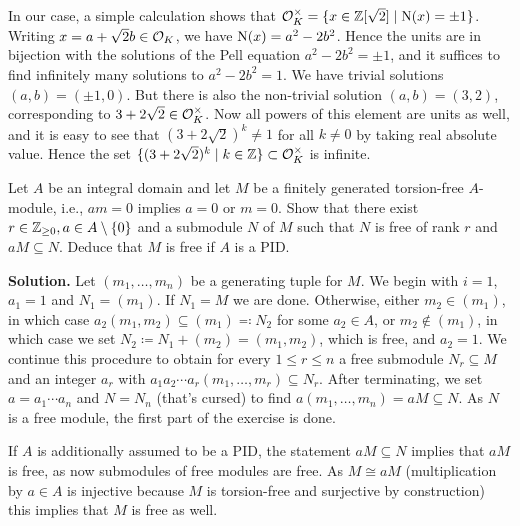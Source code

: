 \documentclass[a4paper,11pt]{article}
\begin{document}
In our case, a simple calculation shows that $\mathcal{O}_K^\times = \{x \in 
\mathbb{Z}[\sqrt 2] \mid \operatorname{N}(x) = \pm 1\}$. Writing $x = a + \sqrt 2 b \in \mathcal{O}_K$, we have
$\operatorname{N}(x) = a^2 - 2b^2$. Hence the units are in bijection with the solutions of
the Pell equation $a^2 - 2b^2 = \pm 1$, and it suffices to find infinitely many 
solutions to $a^2 - 2b^2 = 1$. We have trivial solutions $(a,b) = (\pm 1, 0)$.
But there is also the non-trivial solution $(a,b) = (3,2)$, corresponding to
$3 + 2 \sqrt 2 \in \mathcal{O}_K^\times$. Now all powers of this element are units as well, 
and it is easy to see that $(3 + 2\sqrt 2)^k \neq 
1$ for all $k \neq 0$ by taking real absolute value. Hence  the 
set $\{(3+2 \sqrt 2)^k \mid k \in \mathbb{Z}\} \subset \mathcal{O}_K^\times$ is infinite.


Let $A$ be an integral domain and let $M$ be a finitely generated torsion-free
$A$-module, i.e., $am = 0$ implies $a = 0$ or $m = 0$. Show that there exist $r
\in \mathbb{Z}_{\geq 0}, a \in A\setminus \{0\}$ and a submodule $N$ of $M$ such that
$N$ is free of rank $r$ and $aM \subseteq N$. Deduce that $M$ is free if $A$ is
a PID.

\textbf{Solution.} Let $(m_1, \dots, m_n)$ be a generating tuple for $M$. We begin
with $i = 1$, $a_1 = 1$ and $N_1 = (m_1)$. If $N_1 = M$ we are done.
Otherwise, either $m_2 \in (m_1)$, in which
case $a_2(m_1, m_2) \subseteq (m_1) \eqqcolon N_2$ for some $a_2 \in A$, or $m_2
\not \in (m_1)$, in which case we set $N_2 \coloneqq N_1 + (m_2) = (m_1, m_2)$, which
is free, and $a_2 = 1$. We continue this procedure to obtain
for every $1 \leq r \leq n$ a free submodule $N_r \subseteq M$ and an integer $a_r$
with $a_1a_2 \cdots a_r (m_1, \dots, m_r) \subseteq N_r$. After terminating, we set 
$a = a_1 \cdots a_n$ and $N = N_n$ (that's cursed) to find $a(m_1,
\dots, m_n) = aM \subseteq N$. As $N$ is a free module, the first part of the
exercise is done. 

If $A$ is additionally assumed to be a PID, the statement $aM \subseteq N$
implies that $aM$ is free, as now submodules of free modules are free. As $M \cong
aM$ (multiplication by $a \in A$ is injective because $M$ is torsion-free and
surjective by construction) this implies that $M$ is free as well.


\contactend
\end{document}

